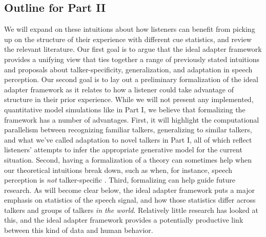\subsection{Outline for Part II}
\label{sec:outline-part-ii}

\label{r-formalization-benefits}
We will expand on these intuitions about how listeners can benefit from picking up on the structure of their experience with different cue statistics, and review the relevant literature.  Our first goal is to argue that the ideal adapter framework provides a unifying view that ties together a range of previously stated intuitions and proposals about talker-specificity, generalization, and adaptation in speech perception.  Our second goal is to lay out a preliminary formalization of the ideal adapter framework as it relates to how a listener could take advantage of structure in their prior experience.  While we will not present any implemented, quantitative model simulations like in Part I, we believe that formalizing the framework has a number of advantages.  First, it will highlight the computational parallelism between recognizing familiar talkers, generalizing to similar talkers, and what we've called adaptation to novel talkers in Part I, all of which reflect listeners' attempts to infer the appropriate generative model for the current situation.  Second, having a formalization of a theory can sometimes help when our theoretical intuitions break down, such as when, for instance, speech perception is \emph{not} talker-specific \autocite[e.g.][]{Kraljic2007}.  Third, formalizing can help guide future research.  As will become clear below, the ideal adapter framework puts a major emphasis on statistics of the speech signal, and how those statistics differ across talkers and groups of talkers \emph{in the world}.  Relatively little research has looked at this, and the ideal adapter framework provides a potentially productive link between this kind of data and human behavior.

